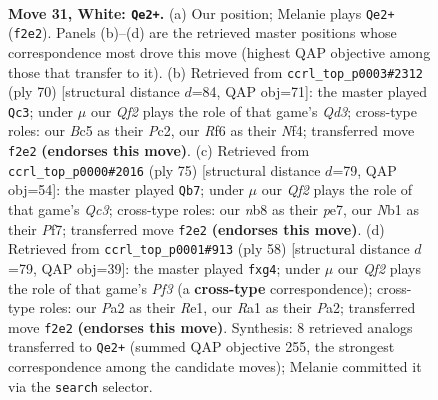 \documentclass[11pt]{article}
\begin{document}
\clearpage

\begin{figure}[p]\centering
\begin{subfigure}{0.46\textwidth}\centering
\resizebox{\linewidth}{!}{%
\newchessgame
\chessboard[
  setfen={rnb1k3/8/5R2/p1Bp2q1/1p6/6r1/PPP2QP1/RN4K1 w - - 8 31},
  showmover=false,
  pgfstyle=straightmove, color=movearrow, markmove={f2-e2}
]}
\caption{}
\end{subfigure}\hfill
\begin{subfigure}{0.46\textwidth}\centering
\resizebox{\linewidth}{!}{%
\newchessgame
\chessboard[
  setfen={4k3/8/p2pp2p/1p6/3rPNqb/PP1Q1R2/2P5/1K6 w - - 1 36},
  showmover=false,
  pgfstyle=straightmove, color=movearrow, markmove={d3-c3}
]}
\caption{}
\end{subfigure}
\\[4pt]
\begin{subfigure}{0.46\textwidth}\centering
\resizebox{\linewidth}{!}{%
\newchessgame
\chessboard[
  setfen={2r3k1/4Pp2/2qp2pp/1p1R4/2n1P3/6P1/4R1KP/3Q4 b - - 1 38},
  showmover=false,
  pgfstyle=straightmove, color=movearrow, markmove={c6-b7}
]}
\caption{}
\end{subfigure}\hfill
\begin{subfigure}{0.46\textwidth}\centering
\resizebox{\linewidth}{!}{%
\newchessgame
\chessboard[
  setfen={1r5k/2q1n3/p4p1p/2pp3P/5Pr1/2P1QP2/P1B5/2K1R3 w - - 0 30},
  showmover=false,
  pgfstyle=straightmove, color=movearrow, markmove={f3-g4}
]}
\caption{}
\end{subfigure}
\caption{\textbf{Move 31, White: \texttt{Qe2+}.} (a) Our position; Melanie plays \texttt{Qe2+} (\texttt{f2e2}). Panels (b)--(d) are the retrieved master positions whose correspondence most drove this move (highest QAP objective among those that transfer to it). (b) Retrieved from \texttt{ccrl\_top\_p0003\#2312} (ply 70) [structural distance $d$=84, QAP obj=71]: the master played \texttt{Qc3}; under $\mu$ our \emph{Qf2} plays the role of that game's \emph{Qd3}; cross-type roles: our \emph{B}c5 as their \emph{P}c2, our \emph{R}f6 as their \emph{N}f4; transferred move \texttt{f2e2} \textbf{(endorses this move)}. (c) Retrieved from \texttt{ccrl\_top\_p0000\#2016} (ply 75) [structural distance $d$=79, QAP obj=54]: the master played \texttt{Qb7}; under $\mu$ our \emph{Qf2} plays the role of that game's \emph{Qc3}; cross-type roles: our \emph{n}b8 as their \emph{p}e7, our \emph{N}b1 as their \emph{P}f7; transferred move \texttt{f2e2} \textbf{(endorses this move)}. (d) Retrieved from \texttt{ccrl\_top\_p0001\#913} (ply 58) [structural distance $d$=79, QAP obj=39]: the master played \texttt{fxg4}; under $\mu$ our \emph{Qf2} plays the role of that game's \emph{Pf3} (a \textbf{cross-type} correspondence); cross-type roles: our \emph{P}a2 as their \emph{R}e1, our \emph{R}a1 as their \emph{P}a2; transferred move \texttt{f2e2} \textbf{(endorses this move)}. Synthesis: 8 retrieved analogs transferred to \texttt{Qe2+} (summed QAP objective 255, the strongest correspondence among the candidate moves); Melanie committed it via the \texttt{search} selector.}
\label{fig:thought-m60}
\end{figure}
\end{document}
